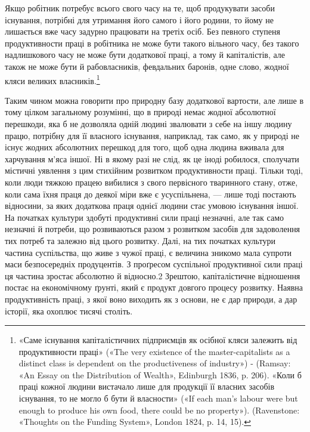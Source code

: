 Якщо робітник потребує всього свого часу на те, щоб продукувати
засоби існування, потрібні для утримання його самого і
його родини, то йому не лишається вже часу задурно працювати
на третіх осіб. Без певного ступеня продуктивности праці в робітника
не може бути такого вільного часу, без такого надлишкового
часу не може бути додаткової праці, а тому й капіталістів,
але також не може бути й рабовласників, февдальних баронів,
одне слово, жодної кляси великих власників.\footnote{
«Саме існування капіталістичних підприємців як осібної кляси
залежить від продуктивности праці» («The very existence of the master-capitalists
as a distinct class is dependent on the productiveness
of industry») - (Ramsay: «An Essay on the Distribution of Wealth»,
Edinburgh 1836, p. 206). «Коли б праці кожної людини вистачало лише
для продукції її власних засобів існування, то не могло б бути й власности»
(«If each man’s labour were but enough to produce his own food,
there could be no property»). (Ravenstone: «Thoughts on the Funding
System», London 1824, p. 14, 15).
}

Таким чином можна говорити про природну базу додаткової
вартости, але лише в тому цілком загальному розумінні, що в
природі немає жодної абсолютної перешкоди, яка б не дозволяла
одній людині звалювати з себе на іншу людину працю, потрібну
для її власного існування, наприклад, так само, як у природі
не існує жодних абсолютних перешкод для того, щоб одна людина
вживала для харчування м’яса іншої. Ні в якому разі не
слід, як це іноді робилося, сполучати містичні уявлення з
цим стихійним розвитком продуктивности праці. Тільки тоді,
коли люди тяжкою працею вибилися з свого первісного тваринного
стану, отже, коли сама їхня праця до деякої міри вже є
усуспільнена, — лише тоді постають відносини, за яких додаткова
праця однієї людини стає умовою існування іншої. На початках
культури здобуті продуктивні сили праці незначні, але так само
незначні й потреби, що розвиваються разом з розвитком засобів
для задоволення тих потреб та залежно від цього розвитку. Далі,
на тих початках культури частина суспільства, що живе з чужої
праці, є величина зникомо мала супроти маси безпосередніх продуцентів.
З проґресом суспільної продуктивної сили праці ця
частина зростає абсолютно й відносно.2 Зрештою, капіталістичне
відношення постає на економічному ґрунті, який є продукт
довгого процесу розвитку. Наявна продуктивність праці,
з якої воно виходить як з основи, не є дар природи, а дар історії,
яка охоплює тисячі століть.


